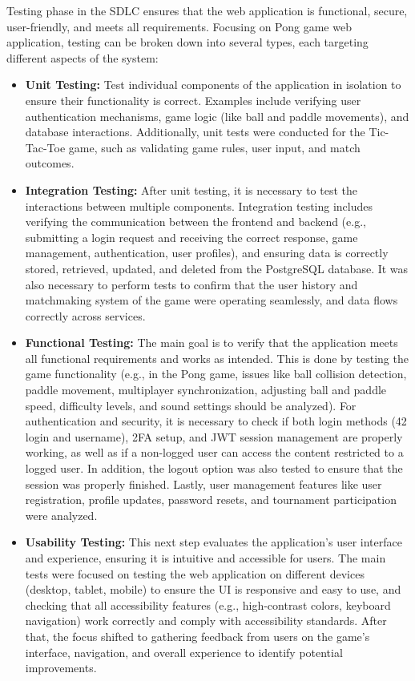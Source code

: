 Testing phase in the SDLC ensures that the web application is functional, secure, user-friendly, and meets all requirements. Focusing on Pong game web application, testing can be broken down into several types, each targeting different aspects of the system:
\begin{itemize}
    \item \textbf{Unit Testing:} Test individual components of the application in isolation to ensure their functionality is correct. Examples include verifying user authentication mechanisms, game logic (like ball and paddle movements), and database interactions. Additionally, unit tests were conducted for the Tic-Tac-Toe game, such as validating game rules, user input, and match outcomes.
    
    \item \textbf{Integration Testing:} After unit testing, it is necessary to test the interactions between multiple components. Integration testing includes verifying the communication between the frontend and backend (e.g., submitting a login request and receiving the correct response, game management, authentication, user profiles), and ensuring data is correctly stored, retrieved, updated, and deleted from the PostgreSQL database. It was also necessary to perform tests to confirm that the user history and matchmaking system of the game were operating seamlessly, and data flows correctly across services.
    
    \item \textbf{Functional Testing:} The main goal is to verify that the application meets all functional requirements and works as intended. This is done by testing the game functionality (e.g., in the Pong game, issues like ball collision detection, paddle movement, multiplayer synchronization, adjusting ball and paddle speed, difficulty levels, and sound settings should be analyzed). For authentication and security, it is necessary to check if both login methods (42 login and username), 2FA setup, and JWT session management are properly working, as well as if a non-logged user can access the content restricted to a logged user. In addition, the logout option was also tested to ensure that the session was properly finished. Lastly, user management features like user registration, profile updates, password resets, and tournament participation were analyzed.
    
    \item \textbf{Usability Testing:} This next step evaluates the application's user interface and experience, ensuring it is intuitive and accessible for users. The main tests were focused on testing the web application on different devices (desktop, tablet, mobile) to ensure the UI is responsive and easy to use, and checking that all accessibility features (e.g., high-contrast colors, keyboard navigation) work correctly and comply with accessibility standards. After that, the focus shifted to gathering feedback from users on the game's interface, navigation, and overall experience to identify potential improvements.
    

\end{itemize}
